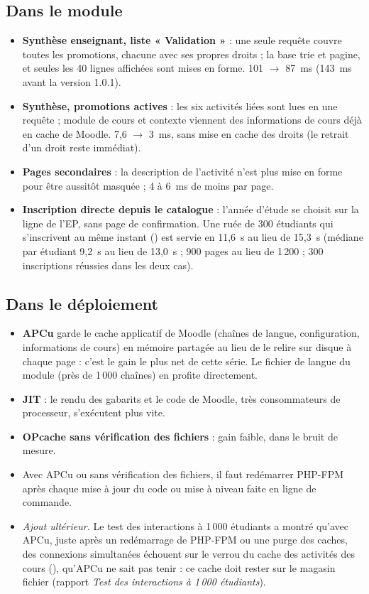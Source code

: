 \documentclass[11pt,a4paper]{article}
\newcommand{\code}[1]{\texttt{\detokenize{#1}}}
\begin{document}
\subsection{Dans le module}
\begin{itemize}
  \item \textbf{Synthèse enseignant, liste « Validation »} : une seule requête couvre toutes les
    promotions, chacune avec ses propres droits ; la base trie et pagine, et seules les 40 lignes
    affichées sont mises en forme. 101 $\to$ 87~ms (143~ms avant la version 1.0.1).
  \item \textbf{Synthèse, promotions actives} : les six activités liées sont lues en une requête ;
    module de cours et contexte viennent des informations de cours déjà en cache de Moodle.
    7,6 $\to$ 3~ms, sans mise en cache des droits (le retrait d'un droit reste immédiat).
  \item \textbf{Pages secondaires} : la description de l'activité n'est plus mise en forme pour
    être aussitôt masquée ; 4 à 6~ms de moins par page.
  \item \textbf{Inscription directe depuis le catalogue} : l'année d'étude se choisit sur la ligne
    de l'EP, sans page de confirmation. Une ruée de 300 étudiants qui s'inscrivent au même instant
    (\code{ruee.py}) est servie en 11,6~s au lieu de 15,3~s (médiane par étudiant 9,2~s au lieu de
    13,0~s ; 900 pages au lieu de 1\,200 ; 300 inscriptions réussies dans les deux cas).
\end{itemize}

\subsection{Dans le déploiement}
\begin{itemize}
  \item \textbf{APCu} garde le cache applicatif de Moodle (chaînes de langue, configuration,
    informations de cours) en mémoire partagée au lieu de le relire sur disque à chaque page :
    c'est le gain le plus net de cette série. Le fichier de langue du module (près de
    1\,000 chaînes) en profite directement.
  \item \textbf{JIT} : le rendu des gabarits et le code de Moodle, très consommateurs de
    processeur, s'exécutent plus vite.
  \item \textbf{OPcache sans vérification des fichiers} : gain faible, dans le bruit de mesure.
  \item Avec APCu ou sans vérification des fichiers, il faut redémarrer PHP-FPM après chaque mise
    à jour du code ou mise à niveau faite en ligne de commande.
  \item \emph{Ajout ultérieur.} Le test des interactions à 1\,000 étudiants a montré qu'avec
    APCu, juste après un redémarrage de PHP-FPM ou une purge des caches, des connexions
    simultanées échouent sur le verrou du cache des activités des cours (\code{core/coursemodinfo}),
    qu'APCu ne sait pas tenir : ce cache doit rester sur le magasin fichier
    (rapport \emph{Test des interactions à 1\,000 étudiants}).
\end{itemize}
\end{document}
